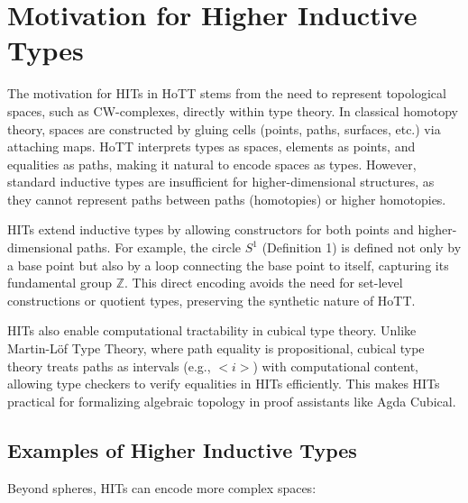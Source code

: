 \documentclass{article}
\theoremstyle{definition}
\begin{document}
\section{Motivation for Higher Inductive Types}
The motivation for HITs in HoTT stems from the need to represent topological spaces, such as CW-complexes, directly within type theory. In classical homotopy theory, spaces are constructed by gluing cells (points, paths, surfaces, etc.) via attaching maps. HoTT interprets types as spaces, elements as points, and equalities as paths, making it natural to encode spaces as types. However, standard inductive types are insufficient for higher-dimensional structures, as they cannot represent paths between paths (homotopies) or higher homotopies.

HITs extend inductive types by allowing constructors for both points and higher-dimensional paths. For example, the circle \( S^1 \) (Definition 1) is defined not only by a base point but also by a loop connecting the base point to itself, capturing its fundamental group \( \mathbb{Z} \). This direct encoding avoids the need for set-level constructions or quotient types, preserving the synthetic nature of HoTT.

HITs also enable computational tractability in cubical type theory. Unlike Martin-Löf Type Theory, where path equality is propositional, cubical type theory treats paths as intervals (e.g., \( <i> \)) with computational content, allowing type checkers to verify equalities in HITs efficiently. This makes HITs practical for formalizing algebraic topology in proof assistants like Agda Cubical.

\subsection{Examples of Higher Inductive Types}
Beyond spheres, HITs can encode more complex spaces:
\end{document}
